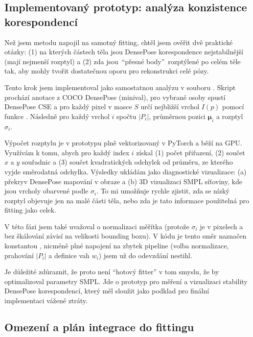 \documentclass[11pt,a4paper,twoside,openright]{report}
\begin{document}
\subsection{Implementovaný prototyp: analýza konzistence korespondencí}

Než jsem metodu napojil na samotný fitting, chtěl jsem ověřit dvě praktické otázky: (1) na kterých částech těla jsou DensePose korespondence nejstabilnější (mají nejmenší rozptyl) a (2) zda jsou \,\enquote{přesné body}\, rozptýlené po celém těle tak, aby mohly tvořit dostatečnou oporu pro rekonstrukci celé pózy.

Tento krok jsem implementoval jako samostatnou analýzu v souboru . Skript prochází anotace z COCO DensePose (minival), pro vybrané osoby spustí DensePose CSE a pro každý pixel v masce $S$ určí nejbližší vrchol $I(p)$ pomocí funkce . Následně pro každý vrchol $i$ spočtu $|P_i|$, průměrnou pozici $\boldsymbol{\mu}_i$ a rozptyl $\sigma_i$.

Výpočet rozptylu je v prototypu plně vektorizovaný v PyTorch a běží na GPU. Využívám  k tomu, abych pro každý index $i$ získal (1) počet přiřazení, (2) součet $x$ a $y$ souřadnic a (3) součet kvadratických odchylek od průměru, ze kterého vyjde směrodatná odchylka. Výsledky ukládám jako diagnostické vizualizace: (a) překryv DensePose mapování v obraze a (b) 3D vizualizaci SMPL síťoviny, kde jsou vrcholy obarvené podle $\sigma_i$. To mi umožňuje rychle zjistit, zda se nízký rozptyl objevuje jen na malé části těla, nebo zda je tato informace použitelná pro fitting jako celek.

V této fázi jsem také uvažoval o normalizaci měřítka (protože $\sigma_i$ je v pixelech a bez škálování závisí na velikosti bounding boxu). V kódu je tento směr naznačen konstantou , nicméně plné napojení na zbytek pipeline (volba normalizace, prahování $|P_i|$ a definice vah $w_i$) jsem už do odevzdání nestihl.

Je důležité zdůraznit, že  proto není \enquote{hotový fitter} v tom smyslu, že by optimalizoval parametry SMPL. Jde o prototyp pro měření a vizualizaci stability DensePose korespondencí, který měl sloužit jako podklad pro finální implementaci vážené ztráty.

\subsection{Omezení a plán integrace do fittingu}
\end{document}
